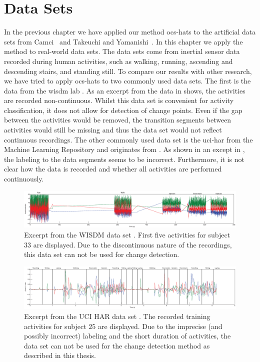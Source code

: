 \section{Data Sets}\label{sec:data_sets}
In the previous chapter we have applied our method \gls{ocs-hats} to the artificial data sets from Camci~\cite{camci2010change} and Takeuchi and Yamanishi~\cite{takeuchi2006unifying}.
In this chapter we apply the method to real-world data sets.
The data sets come from inertial sensor data recorded during human activities, such as walking, running, ascending and descending stairs, and standing still.
To compare our results with other research, we have tried to apply \gls{ocs-hats} to two commonly used data sets.
The first is the data from the \gls{wisdm} lab \cite{kwapisz2011activity}.
As an excerpt from the data in  shows, the activities are recorded non-continuous.
Whilst this data set is convenient for activity classification, it does not allow for detection of change points.
Even if the gap between the activities would be removed, the transition segments between activities would still be missing and thus the data set would not reflect continuous recordings.
The other commonly used data set is the \gls{uci-har} from the Machine Learning Repository and originates from \cite{anguita2012human}.
As shown in an except in , the labeling to the data segments seems to be incorrect.
Furthermore, it is not clear how the data is recorded and whether all activities are performed continuously.

\begin{figure}
\centering
  \includegraphics[width=1\textwidth]{./Figures/Chapter6/data_collection/wisdm_excerpt.eps}
  \caption[WISDM Excerpt]{Excerpt from the WISDM data set \cite{kwapisz2011activity}. First five activities for subject $33$ are displayed. Due to the discontinuous nature of the recordings, this data set can not be used for change detection.}
  \label{fig:wisdm_excerpt}
\end{figure}

\begin{figure}
\centering
  \includegraphics[width=1\textwidth]{./Figures/Chapter6/data_collection/uci_annotated.eps}
  \caption[UCI HAR Excerpt]{Excerpt from the UCI HAR data set \cite{anguita2012human}. The recorded training activities for subject $25$ are displayed. Due to the imprecise (and possibly incorrect) labeling and the short duration of activities, the data set can not be used for the change detection method as described in this thesis.}
  \label{fig:uci_annotated}
\end{figure}

